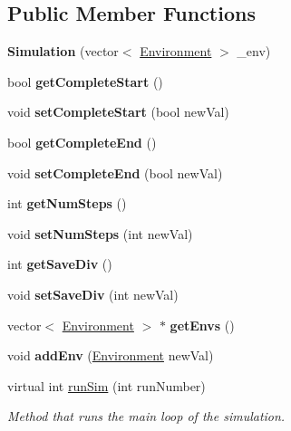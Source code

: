 \subsection*{Public Member Functions}
\begin{DoxyCompactItemize}
\item 
\mbox{\label{classSimulation_ae902fd16a0f0c24d3b49c96cead9fcf9}} 
{\bfseries Simulation} (vector$<$ \hyperlink{classEnvironment}{Environment} $>$ \+\_\+env)
\item 
\mbox{\label{classSimulation_a44dc929698224fbf195b9d9936fae82a}} 
bool {\bfseries get\+Complete\+Start} ()
\item 
\mbox{\label{classSimulation_adca9200350aad6630085d6f50ef910f3}} 
void {\bfseries set\+Complete\+Start} (bool new\+Val)
\item 
\mbox{\label{classSimulation_a31e406c0ad5849a8e6496393ccbb3483}} 
bool {\bfseries get\+Complete\+End} ()
\item 
\mbox{\label{classSimulation_a0e8a32be7804eca80992fa6d1d27b0be}} 
void {\bfseries set\+Complete\+End} (bool new\+Val)
\item 
\mbox{\label{classSimulation_a0cf743fa59385016d9e699fb0093317c}} 
int {\bfseries get\+Num\+Steps} ()
\item 
\mbox{\label{classSimulation_a68c66b40439322e4bda57eaa11386ce6}} 
void {\bfseries set\+Num\+Steps} (int new\+Val)
\item 
\mbox{\label{classSimulation_a57f25582cd263d9739e9d72e75832a67}} 
int {\bfseries get\+Save\+Div} ()
\item 
\mbox{\label{classSimulation_a5346ad2601beff7e3918e25dd667ab4b}} 
void {\bfseries set\+Save\+Div} (int new\+Val)
\item 
\mbox{\label{classSimulation_a0110a1fad0e2390ea90fa387fe09cbdc}} 
vector$<$ \hyperlink{classEnvironment}{Environment} $>$ $\ast$ {\bfseries get\+Envs} ()
\item 
\mbox{\label{classSimulation_a8223c6354f021efcb667815fbd0682c0}} 
void {\bfseries add\+Env} (\hyperlink{classEnvironment}{Environment} new\+Val)
\item 
virtual int \hyperlink{classSimulation_a7eb16da89581b496d33b77efbb63b9cd}{run\+Sim} (int run\+Number)
\begin{DoxyCompactList}\small\item\em Method that runs the main loop of the simulation. \end{DoxyCompactList}\end{DoxyCompactItemize}
